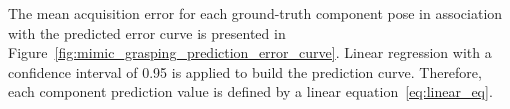 The mean acquisition error for each ground-truth component pose in association with the predicted error curve is presented in Figure~\ref{fig:mimic_grasping_prediction_error_curve}.
Linear regression  with a confidence interval of 0.95 is applied to build the prediction curve. Therefore, each component prediction value is defined by a linear equation~\ref{eq:linear_eq}.

\begin{figure}[h!]
\end{figure}
